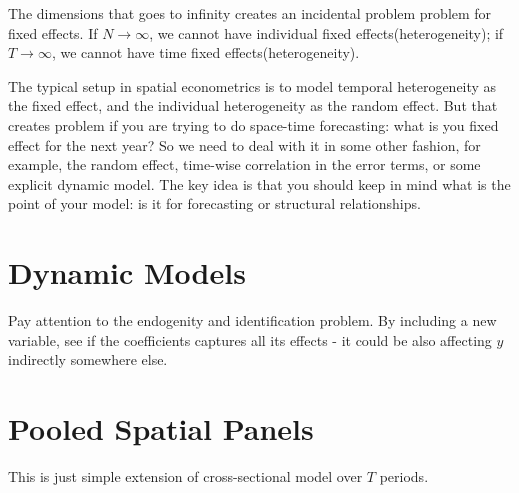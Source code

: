 \documentclass[11pt,a4paper]{amsart}
\theoremstyle{plain}
\theoremstyle{definition}
\begin{document}
The dimensions that goes to infinity creates an incidental problem problem for fixed effects. If $N \rightarrow \infty$, we cannot have individual fixed effects(heterogeneity); if $T \rightarrow \infty$, we cannot have time fixed effects(heterogeneity). 

The typical setup in spatial econometrics is to model temporal heterogeneity as the fixed effect, and the individual heterogeneity as the random effect. But that creates problem if you are trying to do space-time forecasting: what is you fixed effect for the next year? So we need to deal with it in some other fashion, for example, the random effect, time-wise correlation in the error terms, or some explicit dynamic model. The key idea is that you should keep in mind what is the point of your model: is it for forecasting or structural relationships.

\section{Dynamic Models}\hfill\par 
Pay attention to the endogenity and identification problem. By including a new variable, see if the coefficients captures all its effects - it could be also affecting $y$ indirectly somewhere else.

\section{Pooled Spatial Panels}\hfill\par 
This is just simple extension of cross-sectional model over $T$ periods.

\printbibliography %
		
\end{document}
